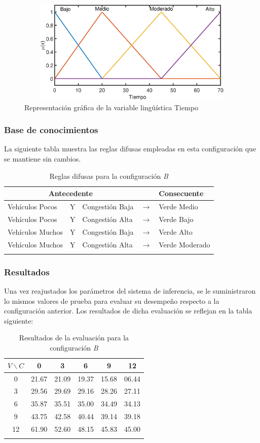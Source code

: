 \begin{figure}[H]
	\centering
	\includegraphics[height=5cm, width=12cm]{Variables/ConfigB_output1.eps}
	\caption[Gráfica variable lingüística tiempo - B]{Representación gráfica de la variable lingüística Tiempo}
\end{figure}

\subsubsection{Base de conocimientos}
La siguiente tabla muestra las reglas difusas empleadas en esta configuración que se mantiene sin cambios.
\begin{longtable}[c]{lclcl} \toprule
	\multicolumn{3}{c}{Antecedente} & & Consecuente \\ \midrule
	Vehículos Pocos & Y & Congestión Baja& $\rightarrow$ & Verde Medio \\
	Vehículos Pocos & Y & Congestión Alta& $\rightarrow$ & Verde Bajo \\
	Vehículos Muchos &Y& Congestión Baja& $\rightarrow$ & Verde Alto \\
	Vehículos Muchos &Y& Congestión Alta& $\rightarrow$ & Verde Moderado \\ \hline
	\caption{Reglas difusas para la configuración \textit{B}}
\end{longtable}

\pagebreak
\subsubsection{Resultados}
Una vez reajustados los parámetros del sistema de inferencia, se le suministraron lo mismos valores de prueba para evaluar su desempeño respecto a la configuración anterior. Los resultados de dicha evaluación se reflejan en la tabla siguiente:

\begin{longtable}[c]{cccccc} \toprule
	$V \backslash C$ &  0 & 3 & 6 & 9 & 12 \\ \midrule
	0 & 21.67 & 21.09 & 19.37 & 15.68 & 06.44 \\
	3 & 29.56 & 29.69 & 29.16 & 28.26 & 27.11 \\
	6 & 35.87 & 35.51 & 35.00 & 34.49 & 34.13 \\
	9 & 43.75 & 42.58 & 40.44 & 39.14 & 39.18 \\
	12& 61.90 & 52.60 & 48.15 & 45.83 & 45.00 \\
	\caption{Resultados de la evaluación para la configuración \textit{B}}
\end{longtable}

